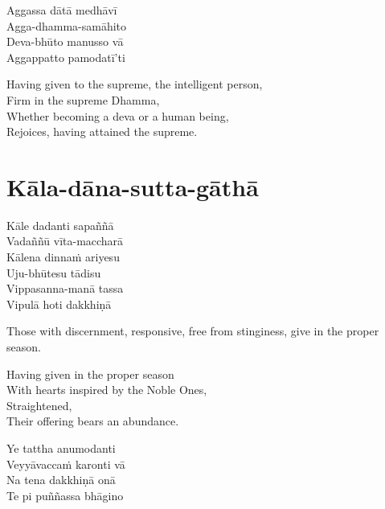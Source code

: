\begin{pali-hang-continued}
  Aggassa dātā medhāvī\\
  Agga-dhamma-samāhito\\
  Deva-bhūto manusso vā\\
  Aggappatto pamodatī'ti
\end{pali-hang-continued}

\begin{english-hang-verses}
  Having given to the supreme, the intelligent person,\\
  Firm in the supreme Dhamma,\\
  Whether becoming a deva or a human being,\\
  Rejoices, having attained the supreme.
\end{english-hang-verses}

\suttaRef{[AN 5.32]}

\section{Kāla-dāna-sutta-gāthā}
\label{kala-dana-sutta-gatha}

\vspace{-0.6em}

\begin{pali-hang}
  Kāle dadanti sapaññā\\
  Vadaññū vīta-maccharā\\
  Kālena dinnaṁ ariyesu\\
  Uju-bhūtesu tādisu\\
  Vippasanna-manā tassa\\
  Vipulā hoti dakkhiṇā
\end{pali-hang}

\vspace{16pt}

\begin{english-verses}
  \begin{english-hangtogether}
    Those with discernment, responsive, free from stinginess, give in the proper season.
  \end{english-hangtogether}
  Having given in the proper season\\
  With hearts inspired by the Noble Ones,\\
  Straightened,\\
  Their offering bears an abundance.
\end{english-verses}

\begin{pali-hang-continued}
  Ye tattha anumodanti\\
  Veyyāvaccaṁ karonti vā\\
  Na tena dakkhiṇā onā\\
  Te pi puññassa bhāgino
\end{pali-hang-continued}

